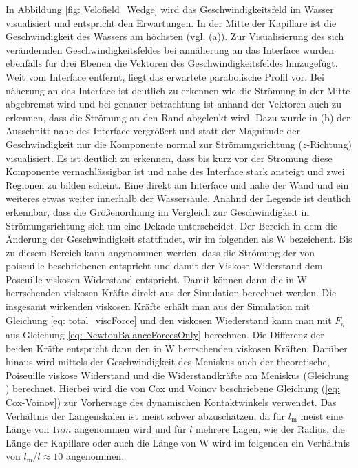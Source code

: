 In Abbildung \ref{fig: Velofield_Wedge} wird das Geschwindigkeitsfeld im Wasser visualisiert und entspricht den Erwartungen. In der Mitte der Kapillare ist die Geschwindigkeit des Wassers am höchsten (vgl. (a)). Zur Visualisierung des sich verändernden Geschwindigkeitsfeldes bei annäherung an das Interface wurden ebenfalls für drei Ebenen die Vektoren des Geschwindigkeitsfeldes hinzugefügt. Weit vom Interface entfernt, liegt das erwartete parabolische Profil vor. Bei näherung an das Interface ist deutlich zu erkennen wie die Strömung in der Mitte abgebremst wird und bei genauer betrachtung ist anhand der Vektoren auch zu erkennen, dass die Strömung an den Rand abgelenkt wird. Dazu wurde in (b) der Ausschnitt nahe des Interface vergrößert und statt der Magnitude der Geschwindigkeit nur die Komponente normal zur Strömungsrichtung ($z$-Richtung) visualisiert. Es ist deutlich zu erkennen, dass bis kurz vor der Strömung diese Komponente vernachlässigbar ist und nahe des Interface stark ansteigt und zwei Regionen zu bilden scheint. Eine direkt am Interface und nahe der Wand und ein weiteres etwas weiter innerhalb der Wassersäule. Anahnd der Legende ist deutlich erkennbar, dass die Größenordnung im Vergleich zur Geschwindigkeit in Strömungsrichtung sich um eine Dekade unterscheidet. Der Bereich in dem die Änderung der Geschwindigkeit stattfindet, wir im folgenden als $\mathrm{W}$ bezeichent. Bis zu diesem Bereich kann angenommen werden, dass die Strömung der von poiseuille beschriebenen entspricht und damit der Viskose Widerstand dem Poseuille viskosen Widerstand entspricht. Damit können dann die in $\mathrm{W}$ herrschenden viskosen Kräfte direkt aus der Simulation berechnet werden. Die insgesamt wirkenden viskosen Kräfte erhält man aus der Simulation mit Gleichung \ref*{eq: total_viscForce} und den viskosen Wiederstand kann man mit $F_{\eta}$ aus Gleichung \ref*{eq: NewtonBalanceForcesOnly} berechnen. Die Differenz der beiden Kräfte entspricht dann den in $\mathrm{W}$ herrschenden viskosen Kräften. 
Darüber hinaus wird mittels der Geschwindigkeit des Meniskus auch der theoretische, Poiseuille viskose Widerstand und die Widerstandkräfte am Meniskus (Gleichung ) berechnet. Hierbei wird die von Cox und Voinov beschriebene Gleichung (\ref*{eq: Cox-Voinov}) zur Vorhersage des dynamischen Kontaktwinkels verwendet. Das Verhältnis der Längenskalen ist meist schwer abzuschätzen, da für $l_{\mathrm{m}}$ meist eine Länge von $1nm$ angenommen wird und für $l$ mehrere Lägen, wie der Radius, die Länge der Kapillare oder auch die Länge von $\mathrm{W}$ wird im folgenden ein Verhältnis von $l_{\mathrm{m}}/l\approx10$ angenommen. 

